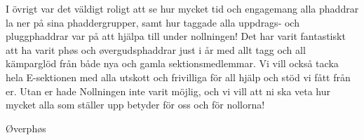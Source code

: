 \documentclass[../_main/handlingar.tex]{subfiles}
\begin{document}
I övrigt var det väldigt roligt att se hur mycket tid och engagemang alla phaddrar la ner på sina phaddergrupper, samt hur taggade alla uppdrags- och pluggphaddrar var på att hjälpa till under nollningen! Det har varit fantastiskt att ha varit phøs och øvergudsphaddrar just i år med allt tagg och all kämparglöd från både nya och gamla sektionsmedlemmar. Vi vill också tacka hela E-sektionen med alla utskott och frivilliga för all hjälp och stöd vi fått från er. Utan er hade Nollningen inte varit möjlig, och vi vill att ni ska veta hur mycket alla som ställer upp betyder för oss och för nollorna!
\begin{signatures}{1}
    \mvh
    \signature{Molly Rusk}{Øverphøs}
\end{signatures}
\end{document}
